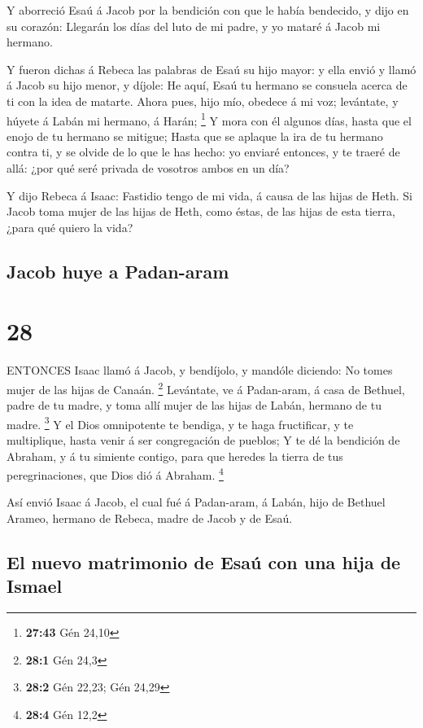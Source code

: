  Y aborreció Esaú á Jacob por la bendición con que le había
bendecido, y dijo en su corazón: Llegarán los días del luto de mi padre,
y yo mataré á Jacob mi hermano.

 Y fueron dichas á Rebeca las palabras de Esaú su hijo
mayor: y ella envió y llamó á Jacob su hijo menor, y díjole: He aquí,
Esaú tu hermano se consuela acerca de ti con la idea de matarte.
 Ahora pues, hijo mío, obedece á mi voz; levántate, y
húyete á Labán mi hermano, á Harán; \footnote{\textbf{27:43} Gén 24,10}
 Y mora con él algunos días, hasta que el enojo de tu
hermano se mitigue;  Hasta que se aplaque la ira de tu
hermano contra ti, y se olvide de lo que le has hecho: yo enviaré
entonces, y te traeré de allá: ¿por qué seré privada de vosotros ambos
en un día?

 Y dijo Rebeca á Isaac: Fastidio tengo de mi vida, á causa
de las hijas de Heth. Si Jacob toma mujer de las hijas de Heth, como
éstas, de las hijas de esta tierra, ¿para qué quiero la vida?

\hypertarget{jacob-huye-a-padan-aram}{%
\subsection{Jacob huye a Padan-aram}\label{jacob-huye-a-padan-aram}}

\hypertarget{section-27}{%
\section{28}\label{section-27}}

 ENTONCES Isaac llamó á Jacob, y bendíjolo, y mandóle
diciendo: No tomes mujer de las hijas de Canaán. \footnote{\textbf{28:1}
  Gén 24,3}  Levántate, ve á Padan-aram, á casa de Bethuel,
padre de tu madre, y toma allí mujer de las hijas de Labán, hermano de
tu madre. \footnote{\textbf{28:2} Gén 22,23; Gén 24,29}  Y
el Dios omnipotente te bendiga, y te haga fructificar, y te multiplique,
hasta venir á ser congregación de pueblos;  Y te dé la
bendición de Abraham, y á tu simiente contigo, para que heredes la
tierra de tus peregrinaciones, que Dios dió á Abraham. \footnote{\textbf{28:4}
  Gén 12,2}

 Así envió Isaac á Jacob, el cual fué á Padan-aram, á Labán,
hijo de Bethuel Arameo, hermano de Rebeca, madre de Jacob y de Esaú.

\hypertarget{el-nuevo-matrimonio-de-esauxfa-con-una-hija-de-ismael}{%
\subsection{El nuevo matrimonio de Esaú con una hija de
Ismael}\label{el-nuevo-matrimonio-de-esauxfa-con-una-hija-de-ismael}}

